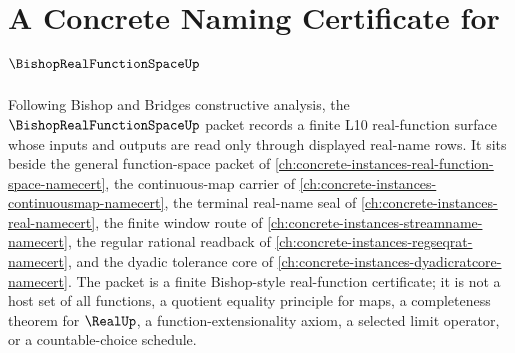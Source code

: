 \chapter{A Concrete Naming Certificate for $\BishopRealFunctionSpaceUp$}
\label{ch:concrete-instances-bishop-real-function-space-namecert}

Following Bishop and Bridges constructive analysis, the $\BishopRealFunctionSpaceUp$ packet records a finite L10 real-function surface whose inputs and outputs are read only through displayed real-name rows. It sits beside the general function-space packet of \autoref{ch:concrete-instances-real-function-space-namecert}, the continuous-map carrier of \autoref{ch:concrete-instances-continuousmap-namecert}, the terminal real-name seal of \autoref{ch:concrete-instances-real-namecert}, the finite window route of \autoref{ch:concrete-instances-streamname-namecert}, the regular rational readback of \autoref{ch:concrete-instances-regseqrat-namecert}, and the dyadic tolerance core of \autoref{ch:concrete-instances-dyadicratcore-namecert}. The packet is a finite Bishop-style real-function certificate; it is not a host set of all functions, a quotient equality principle for maps, a completeness theorem for $\RealUp$, a function-extensionality axiom, a selected limit operator, or a countable-choice schedule.

